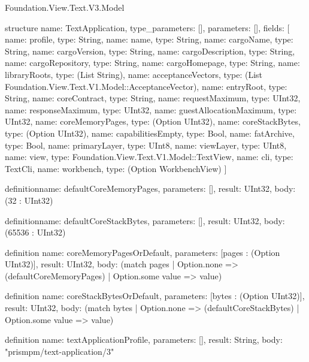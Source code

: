 \begin{lexlean}{Foundation.View.Text.V3.Model}
\begin{semanticmodule}
structure{
  name: TextApplication,
  type_parameters: [],
  parameters: [],
  fields: [
    {name: profile, type: String},
    {name: name, type: String},
    {name: cargoName, type: String},
    {name: cargoVersion, type: String},
    {name: cargoDescription, type: String},
    {name: cargoRepository, type: String},
    {name: cargoHomepage, type: String},
    {name: libraryRoots, type: (List String)},
    {name: acceptanceVectors, type: (List Foundation.View.Text.V1.Model::AcceptanceVector)},
    {name: entryRoot, type: String},
    {name: coreContract, type: String},
    {name: requestMaximum, type: UInt32},
    {name: responseMaximum, type: UInt32},
    {name: guestAllocationMaximum, type: UInt32},
    {name: coreMemoryPages, type: (Option UInt32)},
    {name: coreStackBytes, type: (Option UInt32)},
    {name: capabilitiesEmpty, type: Bool},
    {name: fatArchive, type: Bool},
    {name: primaryLayer, type: UInt8},
    {name: viewLayer, type: UInt8},
    {name: view, type: Foundation.View.Text.V1.Model::TextView},
    {name: cli, type: TextCli},
    {name: workbench, type: (Option WorkbenchView)}
  ]
}

definition{name: defaultCoreMemoryPages, parameters: [], result: UInt32, body: (32 : UInt32)}

definition{name: defaultCoreStackBytes, parameters: [], result: UInt32, body: (65536 : UInt32)}

definition{
  name: coreMemoryPagesOrDefault,
  parameters: [pages : (Option UInt32)],
  result: UInt32,
  body: (match pages | Option.none => (defaultCoreMemoryPages) | Option.some value => value)
}

definition{
  name: coreStackBytesOrDefault,
  parameters: [bytes : (Option UInt32)],
  result: UInt32,
  body: (match bytes | Option.none => (defaultCoreStackBytes) | Option.some value => value)
}

definition{
  name: textApplicationProfile,
  parameters: [],
  result: String,
  body: "prismpm/text-application/3"
}
\end{semanticmodule}
\end{lexlean}
